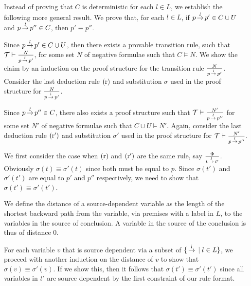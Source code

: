 Instead of proving that $C$ is deterministic for each $l \in L$, we establish the following more general result.
We prove that, for each $l \in L$, if $p \,{\stackrel{{l}}{\rightarrow}}\, p' \in C \cup U$ and $p \,{\stackrel{{l}}{\rightarrow}}\, p'' \in C$, then $p' \equiv p''$.

Since $p \,{\stackrel{{l}}{\rightarrow}}\, p' \in C \cup U$, then there exists a provable transition rule, such that
$\mathcal{T} \vdash \frac{N}{p \,{\stackrel{{l}}{\rightarrow}}\, p'}$, for some set $N$ of negative formulae such that $C \vDash N$.
We show the claim by an induction on the proof structure
for the transition rule $\frac{N}{p \,{\stackrel{{l}}{\rightarrow}}\, p'}$.
Consider the last deduction rule $\mathrm{(r)}$ and substitution $\sigma$
used in the proof structure for $\frac{N}{p \,{\stackrel{{l}}{\rightarrow}}\, p'}$.


Since $p \,{\stackrel{{l}}{\rightarrow}}\, p'' \in C$,
there also exists a proof structure such that $\mathcal{T} \vdash \frac{N'}{p \,{\stackrel{{l}}{\rightarrow}}\, p''}$
for some set $N'$ of negative formulae such that $C \cup U \vDash N'$.
Again, consider the last deduction rule $\mathrm{(r')}$ and substitution $\sigma'$ used in the proof structure for $\mathcal{T} \vdash \frac{N'}{p \,{\stackrel{{l}}{\rightarrow}}\, p''}$.

We first consider the case when $\mathrm{(r)}$ and $\mathrm{(r')}$ are the same rule, say $\frac{\Phi}{t\,{\stackrel{{l}}{\rightarrow}}\,t'}$.
Obviously $\sigma(t)\equiv\sigma'(t)$ since both must be equal to $p$.
Since $\sigma(t')$ and $\sigma'(t')$ are equal to $p'$ and $p''$ respectively, we need to
show that $\sigma(t') \equiv \sigma'(t')$.



We define the distance of a source-dependent variable as the length of the shortest backward path from the variable, via premises with a label in $L$, to the variables in the source of conclusion. A variable in the source of the conclusion is thus of distance 0.

For each variable $v$ that is source dependent via  a subset of $\{ \,{\stackrel{{l}}{\rightarrow}}\, \mid l \in  L\}$, we proceed with another induction
on the distance of $v$ to show that $\sigma(v) \equiv \sigma'(v)$. If we show this, then it follows that $\sigma(t') \equiv \sigma'(t')$ since
all variables in $t'$ are source dependent by the first constraint of our rule format.

